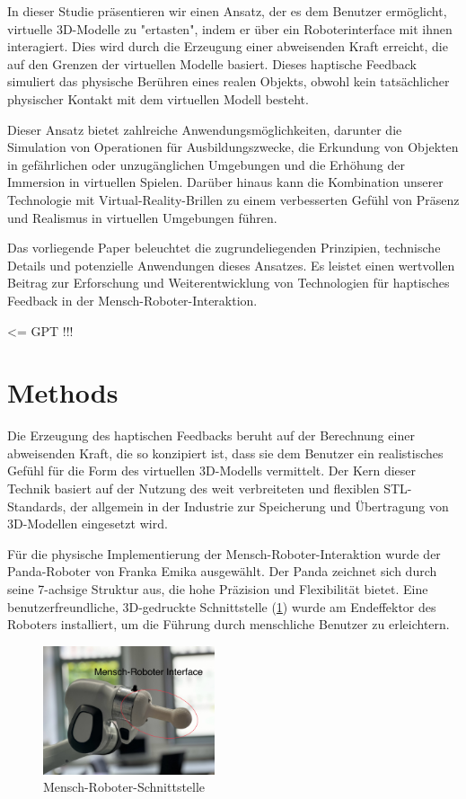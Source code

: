 \documentclass[conference]{IEEEtran}
\begin{document}
In dieser Studie präsentieren wir einen Ansatz, der es dem Benutzer ermöglicht, virtuelle 3D-Modelle zu "ertasten", indem er über ein Roboterinterface mit ihnen interagiert. Dies wird durch die Erzeugung einer abweisenden Kraft erreicht, die auf den Grenzen der virtuellen Modelle basiert. Dieses haptische Feedback simuliert das physische Berühren eines realen Objekts, obwohl kein tatsächlicher physischer Kontakt mit dem virtuellen Modell besteht. 

Dieser Ansatz bietet zahlreiche Anwendungsmöglichkeiten, darunter die Simulation von Operationen für Ausbildungszwecke, die Erkundung von Objekten in gefährlichen oder unzugänglichen Umgebungen und die Erhöhung der Immersion in virtuellen Spielen. Darüber hinaus kann die Kombination unserer Technologie mit Virtual-Reality-Brillen zu einem verbesserten Gefühl von Präsenz und Realismus in virtuellen Umgebungen führen.

Das vorliegende Paper beleuchtet die zugrundeliegenden Prinzipien, technische Details und potenzielle Anwendungen dieses Ansatzes. Es leistet einen wertvollen Beitrag zur Erforschung und Weiterentwicklung von Technologien für haptisches Feedback in der Mensch-Roboter-Interaktion.

<= GPT !!!

\section{Methods}

Die Erzeugung des haptischen Feedbacks beruht auf der Berechnung einer abweisenden Kraft, die so konzipiert ist, dass sie dem Benutzer ein realistisches Gefühl für die Form des virtuellen 3D-Modells vermittelt. Der Kern dieser Technik basiert auf der Nutzung des weit verbreiteten und flexiblen STL-Standards, der allgemein in der Industrie zur Speicherung und Übertragung von 3D-Modellen eingesetzt wird.

Für die physische Implementierung der Mensch-Roboter-Interaktion wurde der Panda-Roboter von Franka Emika ausgewählt. Der Panda zeichnet sich durch seine 7-achsige Struktur aus, die hohe Präzision und Flexibilität bietet. Eine benutzerfreundliche, 3D-gedruckte Schnittstelle (\ref{fig:nullSpace}) wurde am Endeffektor des Roboters installiert, um die Führung durch menschliche Benutzer zu erleichtern.  

\begin{figure}
    \centering
    \includegraphics[width=0.45\textwidth]{pics/interface.jpeg}
    \caption{Mensch-Roboter-Schnittstelle}
    \label{fig:nullSpace}
\end{figure}
\end{document}
